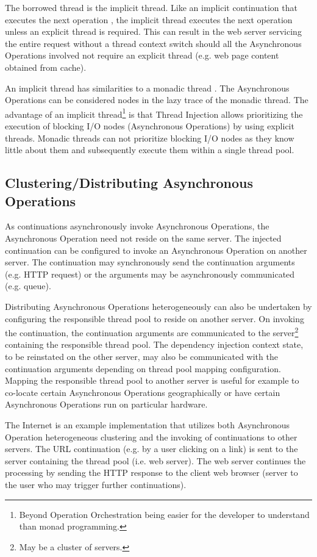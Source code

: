 \documentclass[prodmode]{style/acmlarge}
\begin{document}
The borrowed thread is the implicit thread.  Like an implicit continuation that
executes the next operation \cite{continuations}, the implicit thread executes
the next operation unless an explicit thread is required.  This can result in
the web server servicing the entire request without a thread context switch
should all the Asynchronous Operations involved not require an explicit thread
(e.g. web page content obtained from cache).

An implicit thread has similarities to a monadic thread \cite{monadic-thread}.
The Asynchronous Operations can be considered nodes in the lazy trace of the
monadic thread.  The advantage of an implicit thread\footnote{Beyond Operation
Orchestration being easier for the developer to understand than monad
programming.} is that Thread Injection allows prioritizing the execution of
blocking I/O nodes (Asynchronous Operations) by using explicit threads.  Monadic
threads can not prioritize blocking I/O nodes as they know little about them and
subsequently execute them within a single thread pool.


\subsection{Clustering/Distributing Asynchronous Operations}

As continuations asynchronously invoke Asynchronous Operations, the Asynchronous
Operation need not reside on the same server.  The injected continuation can be
configured to invoke an Asynchronous Operation on another server.  The
continuation may synchronously send the continuation arguments (e.g. HTTP
request) or the arguments may be asynchronously communicated (e.g.
queue).

Distributing Asynchronous Operations heterogeneously can also be undertaken by
configuring the responsible thread pool to reside on another server.  On
invoking the continuation, the continuation arguments are communicated to the
server\footnote{May be a cluster of servers.} containing the responsible thread
pool.  The dependency injection context state, to be reinstated on the other
server, may also be communicated with the continuation arguments depending on
thread pool mapping configuration.  Mapping the responsible thread pool to
another server is useful for example to co-locate certain Asynchronous
Operations geographically or have certain Asynchronous Operations run on
particular hardware.

The Internet is an example implementation that utilizes both Asynchronous
Operation heterogeneous clustering and the invoking of continuations to other
servers.  The URL continuation (e.g. by a user clicking on a link) is sent to
the server containing the thread pool (i.e. web server).  The web server
continues the processing by sending the HTTP response to the client web browser
(server to the user who may trigger further continuations).
\end{document}
